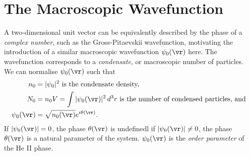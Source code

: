 \documentclass[qo.tex]{subfiles}
\begin{document}
\section{The Macroscopic Wavefunction}
A two-dimensional unit vector can be equivalently described by the phase of a \emph{complex number}, such as the Gross-Pitaevskii wavefunction, motivating the introduction of a similar macroscopic wavefunction $\psi_0(\vr)$ here. 
The wavefunction corresponds to a \emph{condensate}, or macroscopic number of particles. 
We can normalise $\psi_0(\vr)$ such that 
\begin{align}
    n_0 &= |\psi_0|^2 \text{ is the condensate density,} \\
    N_0 &= n_0V = \int |\psi_0(\vr)|^2\,d^3r \text{ is the number of condensed particles, and} \\
    \psi_0(\vr) &= \sqrt{n_0(\vr)}e^{i\theta(\vr)}.
\end{align}
If $|\psi_0(\vr)|=0$, the phase $\theta(\vr)$ is undefinedl if $|\psi_0(\vr)|\neq0$, the phase $\theta(\vr)$ is a natural parameter of the system. 
$\psi_0(\vr)$ is the \emph{order parameter} of the He II phase. 
\end{document}
